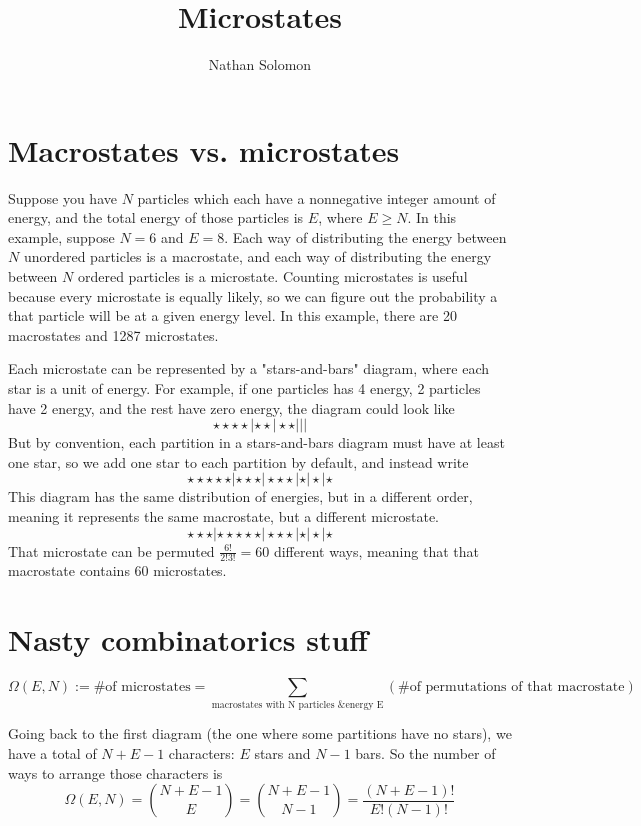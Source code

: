 \documentclass[12pt]{article}
\begin{document}
\title{Microstates}
\author{Nathan Solomon}
\maketitle

\section{Macrostates vs. microstates}
Suppose you have $N$ particles which each have a nonnegative integer amount of energy, and the total energy of those particles is $E$, where $E \geq N$. In this example, suppose $N=6$ and $E=8$. Each way of distributing the energy between $N$ unordered particles is a macrostate, and each way of distributing the energy between $N$ ordered particles is a microstate. Counting microstates is useful because every microstate is equally likely, so we can figure out the probability a that particle will be at a given energy level. In this example, there are 20 macrostates and 1287 microstates.

Each microstate can be represented by a "stars-and-bars" diagram, where each star is a unit of energy. For example, if one particles has 4 energy, 2 particles have 2 energy, and the rest have zero energy, the diagram could look like
\[\star \star \star \star | \star \star | \star \star | | |\]
But by convention, each partition in a stars-and-bars diagram must have at least one star, so we add one star to each partition by default, and instead write
\[\star \star \star \star \star | \star \star \star | \star \star \star | \star | \star | \star\]
This diagram has the same distribution of energies, but in a different order, meaning it represents the same macrostate, but a different microstate.
\[\star \star \star | \star \star \star \star \star | \star \star \star | \star | \star | \star\]
That microstate can be permuted $\frac{6!}{2!3!} = 60$ different ways, meaning that that macrostate contains 60 microstates.

\section{Nasty combinatorics stuff}

\[\Omega(E, N) := \text{\# of microstates} = \sum_{\text{macrostates with N particles \& energy E}} (\text{\# of permutations of that macrostate})\]

Going back to the first diagram (the one where some partitions have no stars), we have a total of $N+E-1$ characters: $E$ stars and $N-1$ bars. So the number of ways to arrange those characters is
\[\Omega(E, N) = {{N+E-1} \choose E} = {{N+E-1} \choose {N-1}} = \frac{(N+E-1)!}{E!(N-1)!} \]
\end{document}
